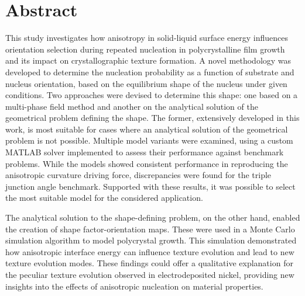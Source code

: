 \chapter{Abstract} \label{ch:abstract}
This study investigates how anisotropy in solid-liquid surface energy influences orientation selection during repeated nucleation in polycrystalline film growth and its impact on crystallographic texture formation. A novel methodology was developed to determine the nucleation probability as a function of substrate and nucleus orientation, based on the equilibrium shape of the nucleus under given conditions. Two approaches were devised to determine this shape: one based on a multi-phase field method and another on the analytical solution of the geometrical problem defining the shape. The former, extensively developed in this work, is most suitable for cases where an analytical solution of the geometrical problem is not possible. Multiple model variants were examined, using a custom MATLAB solver implemented to assess their performance against benchmark problems. While the models showed consistent performance in reproducing the anisotropic curvature driving force, discrepancies were found for the triple junction angle benchmark. Supported with these results, it was possible to select the most suitable model for the considered application. 

The analytical solution to the shape-defining problem, on the other hand, enabled the creation of shape factor-orientation maps. These were used in a Monte Carlo simulation algorithm to model polycrystal growth. This simulation demonstrated how anisotropic interface energy can influence texture evolution and lead to new texture evolution modes. These findings could offer a qualitative explanation for the peculiar texture evolution observed in electrodeposited nickel, providing new insights into the effects of anisotropic nucleation on material properties.




\cleardoublepage

